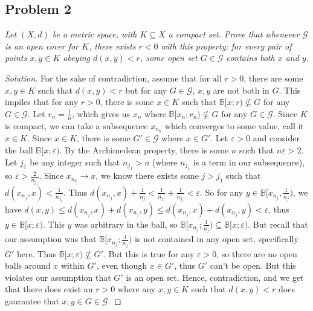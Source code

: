 \documentclass{article}
\newcommand{\ep}{{\varepsilon}}
\begin{document}
\subsection*{Problem 2}
{\it Let $(X, d)$ be a metric space, with $K \subseteq X$ a compact set.
Prove that whenever $\mathcal{G}$ is an open cover for $K$,
there exists $r < 0$ with this property:
for every pair of points $x,y \in K$ obeying $d(x,y) < r$,
some open set $G \in \mathcal{G}$ contains both $x$ and $y$.}

\begin{proof}[Solution]\let\qed\relax
	For the sake of contradiction,
	assume that for all $r>0$, there are some $x, y \in K$ such that
	$d(x,y) < r$ but for any $G \in \mathcal{G}$, $x,y$ are not both in $G$.
	This impiles that for any $r > 0$,
	there is some $x \in K$ such that
	$\mathbb{B}[x;r) \not\subseteq G$ for any $G \in \mathcal{G}$.
	Let $r_n = \frac{1}{n}$,
	which gives us $x_n$ where $\mathbb{B}[x_n;r_n) \not\subseteq G$
	for any $G \in \mathcal{G}$.
	Since $K$ is compact,
	we can take a subsequence $x_{n_k}$ which converges to some value,
	call it $x \in K$.
	Since $x \in K$, there is some $G' \in \mathcal{G}$ where $x \in G'$.
	Let $\ep > 0$ and consider the ball $\mathbb{B}[x;\ep)$.
	By the Archimedean property, there is some $n$ such that
	$n\ep>2$.
	Let $j_1$ be any integer such that $n_{j_1} > n$ (where $n_{j_1}$ is a term in our subsequence),
	so $\ep > \frac{2}{n_{j_1}}$.
	Since $x_{n_k} \to x$, we know there exists some $j > j_1$ such that
	$d(x_{n_j},x) < \frac{1}{n_{j_1}}$.
	Thus $d(x_{n_j},x) + \frac{1}{n_j} < \frac{1}{n_{j_1}} + \frac{1}{n_{j_1}} < \ep$.
	So for any $y \in \mathbb{B}[x_{n_j},\frac{1}{n_j})$,
	we have $d(x,y) \leq d(x_{n_j},x) + d(x_{n_j},y) \leq d(x_{n_j},x) + d(x_{n_j},y) < \ep$,
	thus $y \in \mathbb{B}[x;\ep)$.
	This $y$ was arbitrary in the ball, so
	$\mathbb{B}[x_{n_j};\frac{1}{n_j}) \subseteq \mathbb{B}[x;\ep)$.
	But recall that our assumption was that $\mathbb{B}[x_{n_j};\frac{1}{n_j})$
	is not contained in any open set, specifically $G'$ here.
	Thus $\mathbb{B}[x;\ep) \not\subseteq G'$.
	But this is true for any $\ep>0$,
	so there are no open balls around $x$ within $G'$,
	even though $x \in G'$, thus $G'$ can't be open.
	But this violates our assumption that $G'$ is an open set.
	Hence, contradiction,
	and we get that there does exist an $r>0$ where any $x,y \in K$
	such that $d(x,y)<r$ does gaurantee that $x,y \in G \in \mathcal{G}$.
\end{proof}
\clearpage
~\clearpage
\end{document}
